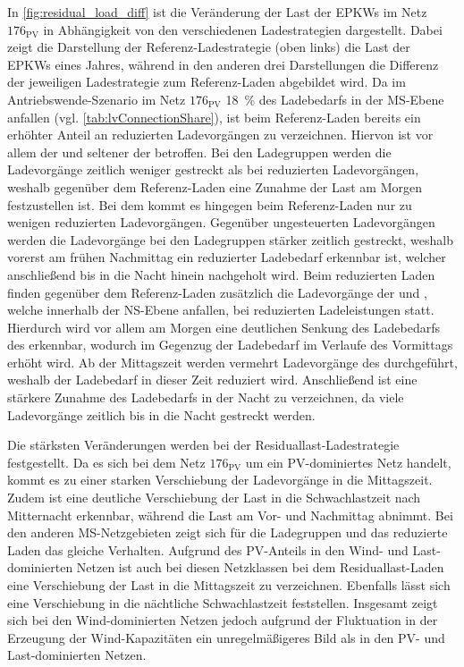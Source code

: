 

In \autoref{fig:residual_load_diff} ist die Veränderung der Last der \glspl{EPKW} im Netz \(176_{\text{PV}}\) in Abhängigkeit von den verschiedenen Ladestrategien dargestellt.
Dabei zeigt die Darstellung der Referenz-Ladestrategie (oben links) die Last der \glspl{EPKW} eines Jahres, während in den anderen drei Darstellungen die Differenz der jeweiligen Ladestrategie zum Referenz-Laden abgebildet wird.
Da im Antriebswende-Szenario im Netz \(176_{\text{PV}}\) \SI{18}{\percent} des Ladebedarfs in der \gls{MS}-Ebene anfallen (vgl. \autoref{tab:lvConnectionShare}), ist beim Referenz-Laden bereits ein erhöhter Anteil an reduzierten Ladevorgängen zu verzeichnen.
Hiervon ist vor allem der \UC \Firmeparkplatz und seltener der \UC \zH betroffen.
Bei den Ladegruppen werden die Ladevorgänge zeitlich weniger gestreckt als bei reduzierten Ladevorgängen, weshalb gegenüber dem Referenz-Laden eine Zunahme der Last am Morgen festzustellen ist.
Bei dem \UC \zH kommt es hingegen beim Referenz-Laden nur zu wenigen reduzierten Ladevorgängen.
Gegenüber ungesteuerten Ladevorgängen werden die Ladevorgänge bei den Ladegruppen stärker zeitlich gestreckt, weshalb vorerst am frühen Nachmittag ein reduzierter Ladebedarf erkennbar ist, welcher anschließend bis in die Nacht hinein nachgeholt wird.
Beim reduzierten Laden finden gegenüber dem Referenz-Laden zusätzlich die Ladevorgänge der \UCs \zH und \Firmeparkplatzdot, welche innerhalb der \gls{NS}-Ebene anfallen, bei reduzierten Ladeleistungen statt.
Hierdurch wird vor allem am Morgen eine deutlichen Senkung des Ladebedarfs des \UC \Firmeparkplatz erkennbar, wodurch im Gegenzug der Ladebedarf im Verlaufe des Vormittags erhöht wird.
Ab der Mittagszeit werden vermehrt Ladevorgänge des \UC \zH durchgeführt, weshalb der Ladebedarf in dieser Zeit reduziert wird.
Anschließend ist eine stärkere Zunahme des Ladebedarfs in der Nacht zu verzeichnen, da viele Ladevorgänge zeitlich bis in die Nacht gestreckt werden.



Die stärksten Veränderungen werden bei der Residuallast-Ladestrategie festgestellt.
Da es sich bei dem Netz \(176_{\text{PV}}\) um ein \gls{PV}-dominiertes Netz handelt, kommt es zu einer starken Verschiebung der Ladevorgänge in die Mittagszeit.
Zudem ist eine deutliche Verschiebung der Last in die Schwachlastzeit nach Mitternacht erkennbar, während die Last am Vor- und Nachmittag abnimmt.
Bei den anderen \gls{MS}-Netzgebieten zeigt sich für die Ladegruppen und das reduzierte Laden das gleiche Verhalten.
Aufgrund des \gls{PV}-Anteils in den Wind- und Last-dominierten Netzen ist auch bei diesen Netzklassen bei dem Residuallast-Laden eine Verschiebung der Last in die Mittagszeit zu verzeichnen.
Ebenfalls lässt sich eine Verschiebung in die nächtliche Schwachlastzeit feststellen.
Insgesamt zeigt sich bei den Wind-dominierten Netzen jedoch aufgrund der Fluktuation in der Erzeugung der Wind-Kapazitäten ein unregelmäßigeres Bild als in den \gls{PV}- und Last-dominierten Netzen.


